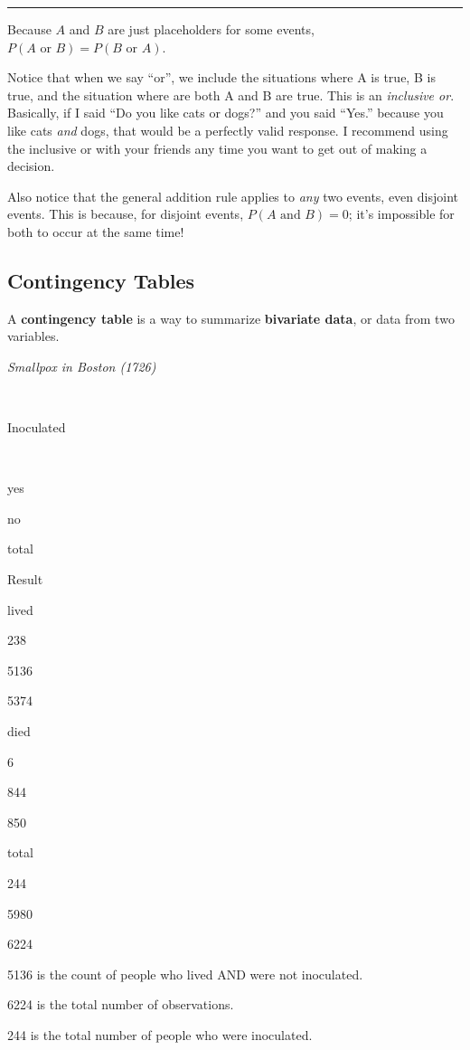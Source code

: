 \documentclass[
]{book}
\begin{document}
\begin{center}\rule{0.5\linewidth}{0.5pt}\end{center}

Because \(A\) and \(B\) are just placeholders for some events, \(P(A \text{ or } B) = P(B \text{ or } A)\).

Notice that when we say ``or'', we include the situations where A is true, B is true, and the situation where are both A and B are true. This is an \emph{inclusive or}. Basically, if I said ``Do you like cats or dogs?'' and you said ``Yes.'' because you like cats \emph{and} dogs, that would be a perfectly valid response. I recommend using the inclusive or with your friends any time you want to get out of making a decision.

Also notice that the general addition rule applies to \emph{any} two events, even disjoint events. This is because, for disjoint events, \(P(A \text{ and } B) = 0\); it's impossible for both to occur at the same time!

\subsection{Contingency Tables}\label{contingency-tables}

A \textbf{contingency table} is a way to summarize \textbf{bivariate data}, or data from two variables.

\emph{Smallpox in Boston (1726)}

~

Inoculated

~

yes

no

total

Result

lived

238

{5136}

{5374}

died

6

844

850

total

{244}

5980

{6224}

{5136} is the count of people who lived AND were not inoculated.~

{6224} is the total number of observations.

{244} is the total number of people who were inoculated.
\end{document}
